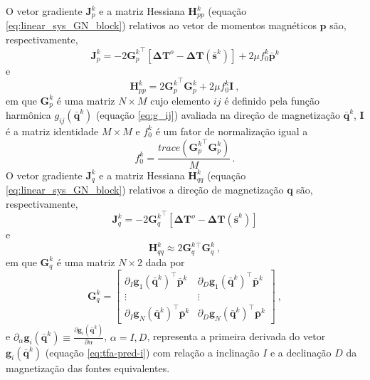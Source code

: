 O vetor gradiente $\mathbf{J}_{p}^{k}$ e a matriz Hessiana $\mathbf{H}_{pp}^{k}$ (equação \ref{eq:linear_sys_GN_block}) 
relativos ao vetor de momentos magnéticos $\mathbf{p}$ são, respectivamente, 
\begin{equation}
\mathbf{J}_{p}^{k} = -2 {\mathbf{G}_{p}^{k}}^{\top} 
\left[ \mathbf{\Delta T}^{o} - \mathbf{\Delta T} (\bar{\mathbf{s}}^{k}) \right] + 
2\mu f_{0}^{k} \bar{\mathbf{p}}^{k} 
\label{eq:grad_p}
\end{equation}
e 
\begin{equation}
\mathbf{H}_{pp}^{k} = 2 {\mathbf{G}_{p}^{k}}^{\top} \mathbf{G}_{p}^{k} + 
2 \mu f_{0}^{k} \mathbf{I} \: ,
\label{eq:hess_p}
\end{equation}
em que $\mathbf{G}_p^{k}$ é uma matriz $N \times M$ cujo elemento $ij$ é definido pela função 
harmônica $g_{ij}(\bar{\mathbf{q}}^{k})$ (equação \ref{eq:g_ij}) avaliada na direção de magnetização 
$\bar{\mathbf{q}}^{k}$, $\mathbf{I}$ é a matriz identidade $M \times M$ e $f_{0}^{k}$ é um fator de 
normalização igual a 
\begin{equation}
f_{0}^{k} = \dfrac{trace \left({\mathbf{G}_{p}^{k}}^{\top} \mathbf{G}_{p}^{k} \right)}{M} \, .
\label{eq:norm_factor}
\end{equation}
O vetor gradiente $\mathbf{J}_{q}^{k}$ e a matriz Hessiana $\mathbf{H}_{qq}^{k}$ (equação \ref{eq:linear_sys_GN_block}) 
relativos a direção de magnetização $\mathbf{q}$ são, respectivamente, 
\begin{equation}
\mathbf{J}_{q}^{k} = -2 {\mathbf{G}_{q}^{k}}^{\top} 
\left[ \mathbf{\Delta T}^{o} - \mathbf{\Delta T} (\bar{\mathbf{s}}^{k}) \right]
\label{eq:grad_q}
\end{equation}
e
\begin{equation}
\mathbf{H}_{qq}^{k} \approx 2 {\mathbf{G}_{q}^{k}}{^\top} \mathbf{G}_{q}^{k} \: ,
\label{eq:hess_q}
\end{equation}
em que $\mathbf{G}_{q}^{k}$ é uma matriz $N \times 2$ dada por 
\begin{equation}
\mathbf{G}_{q}^{k} = \begin{bmatrix}
\partial_{I} \mathbf{g}_{1}(\bar{\mathbf{q}}^{k})^{\top} \bar{\mathbf{p}}^{k} & 
\partial_{D} \mathbf{g}_{1}(\bar{\mathbf{q}}^{k})^{\top} \bar{\mathbf{p}}^{k} \\
\vdots & \vdots  \\
\partial_{I} \mathbf{g}_{N}(\bar{\mathbf{q}}^{k})^{\top} \bar{\mathbf{p}}^{k} & 
\partial_{D} \mathbf{g}_{N}(\bar{\mathbf{q}}^{k})^{\top} \bar{\mathbf{p}}^{k} 
\end{bmatrix} \: ,
\label{eq:Gq}
\end{equation}
e $\partial_{\alpha} \mathbf{g}_{i}(\bar{\mathbf{q}}^{k}) \equiv 
\frac{\partial \mathbf{g}_{i}(\bar{\mathbf{q}}^{k})}{\partial \alpha}$, $\alpha= I, D$, representa a primeira derivada do vetor 
$\mathbf{g}_{i}(\bar{\mathbf{q}}^{k})$ (equação \ref{eq:tfa-pred-i}) com relação a inclinação $I$ e a declinação $D$ 
da magnetização das fontes equivalentes.

